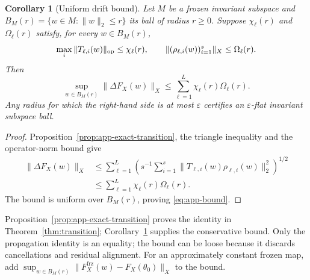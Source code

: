 \documentclass[twoside]{article}
\newtheorem{corollary}[theorem]{Corollary}
\theoremstyle{remark}
\newcommand{\frz}{\mathrm{frz}}
\theoremstyle{highlightdefinition}
\theoremstyle{remark}
\begin{document}
\begin{corollary}[Uniform drift bound]\label{cor:app-uniform-drift}
Let $M$ be a frozen invariant subspace and $B_M(r)=\{w\in M:\|w\|_2\le r\}$ its ball of radius $r\ge0$. Suppose $\chi_\ell(r)$ and $\Omega_\ell(r)$ satisfy, for every $w\in B_M(r)$,
\[
 \max_i\|T_{\ell,i}(w)\|_{\rm op}\le \chi_\ell(r),\qquad
 \| (\rho_{\ell,i}(w))_{i=1}^s\|_X\le\Omega_\ell(r).
\]
Then
\begin{equation}
 \sup_{w\in B_M(r)}\|\Delta F_X(w)\|_X
       \le\sum_{\ell=1}^L \chi_\ell(r)\Omega_\ell(r).
 \label{eq:app-bound}
\end{equation}
Any radius for which the right-hand side is at most $\varepsilon$ certifies an $\varepsilon$-flat invariant subspace ball.
\end{corollary}
\begin{proof}
Proposition~\ref{prop:app-exact-transition}, the triangle inequality and the operator-norm bound give
\begin{align*}
 \|\Delta F_X(w)\|_X
 &\le\sum_{\ell=1}^L\left(s^{-1}\sum_{i=1}^s\|T_{\ell,i}(w)\rho_{\ell,i}(w)\|_2^2\right)^{1/2}\\
 &\le\sum_{\ell=1}^L \chi_\ell(r)\Omega_\ell(r).
\end{align*}
The bound is uniform over $B_M(r)$, proving \eqref{eq:app-bound}.
\end{proof}
Proposition~\ref{prop:app-exact-transition} proves the identity in Theorem~\ref{thm:transition}; Corollary~\ref{cor:app-uniform-drift} supplies the conservative bound. Only the propagation identity is an equality; the bound can be loose because it discards cancellations and residual alignment. For an approximately constant frozen map, add $\sup_{w\in B_M(r)}\|F_X^{\frz}(w)-F_X(\theta_0)\|_X$ to the bound.
\end{document}
